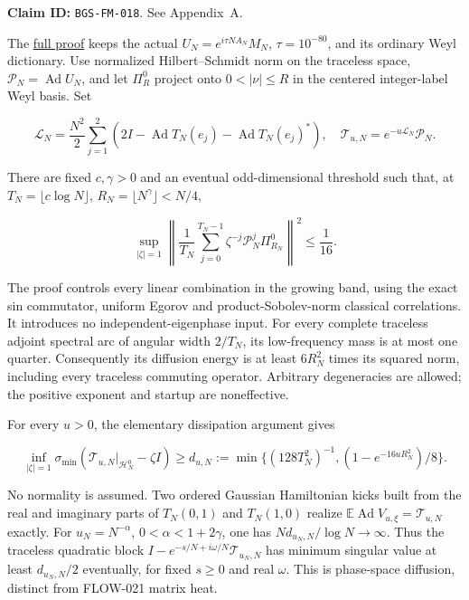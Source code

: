 \textbf{Claim ID:} \texttt{BGS-FM-018}. See Appendix~A.

\begin{theorem}\label{pass2:frontier-fm-018}

The
\href{https://github.com/ChurilovMaksim/BGS/blob/main/mathematics/frozen_operator_transfer_coercivity.md}{full proof} keeps the actual
\(U_N=e^{i\tau NA_N}M_N\), \(\tau=10^{-80}\), and its ordinary Weyl dictionary.
Use normalized Hilbert--Schmidt norm on the traceless space,
\(\mathcal P_N=\operatorname{Ad}U_N\), and let \(\Pi_R^0\) project onto
\(0<|\nu|\le R\) in the centered integer-label Weyl basis. Set

\[
\mathscr L_N=\frac{N^2}{2}\sum_{j=1}^2
 (2I-\operatorname{Ad}T_N(e_j)-\operatorname{Ad}T_N(e_j)^*),\quad
\mathcal T_{u,N}=e^{-u\mathscr L_N}\mathcal P_N.
\]

There are fixed \(c,\gamma>0\) and an eventual odd-dimensional threshold
such that, at \(T_N=\lfloor c\log N\rfloor\),
\(R_N=\lfloor N^\gamma\rfloor<N/4\),

\[
\sup_{|\zeta|=1}
 \left\|\frac1{T_N}\sum_{j=0}^{T_N-1}
        \zeta^{-j}\mathcal P_N^j\Pi_{R_N}^0\right\|^2\le\frac1{16}.
\]

\end{theorem}

The proof controls every linear combination in the growing band,
using the exact sin commutator, uniform Egorov and product-Sobolev-norm
classical correlations. It introduces no independent-eigenphase input.
For every complete traceless adjoint spectral arc of angular width
\(2/T_N\), its low-frequency mass is at most one quarter. Consequently
its diffusion energy is at least \(6R_N^2\) times its squared norm,
including every traceless commuting operator. Arbitrary degeneracies
are allowed; the positive exponent and startup are noneffective.

For every \(u>0\), the elementary dissipation argument gives

\[
\inf_{|\zeta|=1}\sigma_{\min}
 (\mathcal T_{u,N}|_{\mathcal H_N^0}-\zeta I)
 \ge d_{u,N}:=\min\{(128T_N^2)^{-1},(1-e^{-16uR_N^2})/8\}.
\]

No normality is assumed. Two ordered Gaussian Hamiltonian kicks built
from the real and imaginary parts of \(T_N(0,1)\) and \(T_N(1,0)\) realize
\(\mathbb E\operatorname{Ad}V_{u,\xi}=\mathcal T_{u,N}\) exactly.
For \(u_N=N^{-\alpha}\), \(0<\alpha<1+2\gamma\), one has
\(Nd_{u_N,N}/\log N\to\infty\). Thus the traceless quadratic block
\(I-e^{-s/N+i\omega/N}\mathcal T_{u_N,N}\) has minimum singular value
at least \(d_{u_N,N}/2\) eventually, for fixed \(s\ge0\) and real \(\omega\).
This is phase-space diffusion, distinct from FLOW-021 matrix heat.

